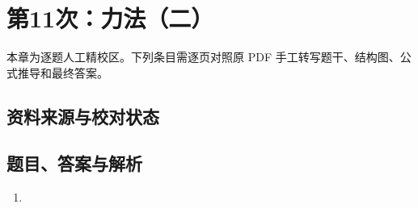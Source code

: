 \chapter{第11次：力法（二）}

本章为逐题人工精校区。下列条目需逐页对照原 PDF 手工转写题干、结构图、公式推导和最终答案。

\section{资料来源与校对状态}


\section{题目、答案与解析}

\begin{enumerate}[label=\textbf{第\arabic*题},wide]
  \item
  \begin{problemBox}
  \end{problemBox}

  \begin{solutionBox}
  \end{solutionBox}
\end{enumerate}
